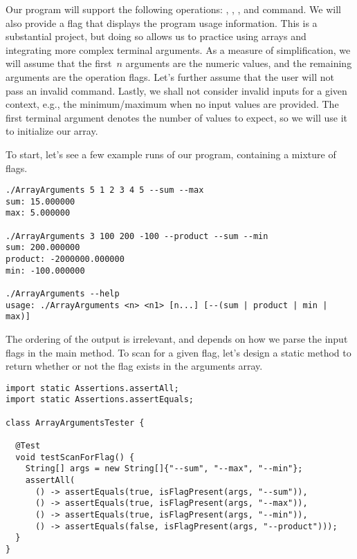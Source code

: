 Our program will support the following operations: , , , and  command. 
We will also provide a  flag that displays the program usage information. 
This is a substantial project, but doing so allows us to practice using arrays and integrating more complex terminal arguments. 
As a measure of simplification, we will assume that the first~$n$ arguments are the numeric values, and the remaining arguments are the operation flags. 
Let's further assume that the user will not pass an invalid command. 
Lastly, we shall not consider invalid inputs for a given context, e.g., the minimum/maximum when no input values are provided. 
The first terminal argument denotes the number of values to expect, so we will use it to initialize our array.

To start, let's see a few example runs of our program, containing a mixture of flags.



\begin{small}
\begin{verbatim}
./ArrayArguments 5 1 2 3 4 5 --sum --max
sum: 15.000000
max: 5.000000

./ArrayArguments 3 100 200 -100 --product --sum --min
sum: 200.000000
product: -2000000.000000
min: -100.000000

./ArrayArguments --help
usage: ./ArrayArguments <n> <n1> [n...] [--(sum | product | min | max)]
\end{verbatim}
\end{small}

The ordering of the output is irrelevant, and depends on how we parse the input flags in the main method. 
To scan for a given flag, let's design a static method to return whether or not the flag exists in the arguments array.

\enlargethispage{-3\baselineskip}
\begin{lstlisting}[language=MyJava]
import static Assertions.assertAll;
import static Assertions.assertEquals;

class ArrayArgumentsTester {

  @Test
  void testScanForFlag() {
    String[] args = new String[]{"--sum", "--max", "--min"};
    assertAll(
      () -> assertEquals(true, isFlagPresent(args, "--sum")),
      () -> assertEquals(true, isFlagPresent(args, "--max")),
      () -> assertEquals(true, isFlagPresent(args, "--min")),
      () -> assertEquals(false, isFlagPresent(args, "--product")));
  }
}
\end{lstlisting}

